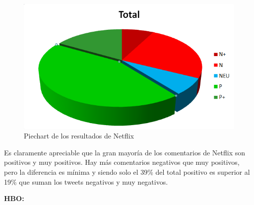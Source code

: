 \begin{figure}[H]
	\centering
	\includegraphics[scale=1]{imagenes/piechartNetflixAll.PNG}
	\caption{Piechart de los resultados de Netflix}
	\label{fig:piechartNetflixAll}
\end{figure}


Es claramente apreciable que la gran mayoría de los comentarios de Netflix son positivos y muy positivos. Hay más comentarios negativos que muy positivos,  pero la diferencia es mínima y siendo solo el 39\% del total positivo es superior al 19\% que suman los tweets negativos y muy negativos. 




\textbf{HBO: }

